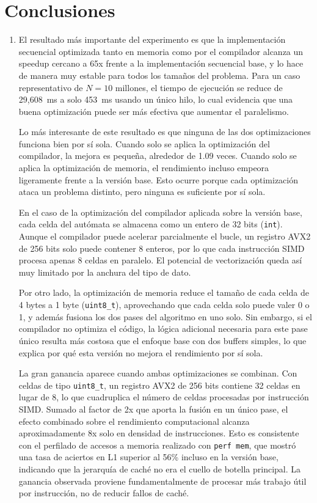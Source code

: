 
\section{Conclusiones}
\label{sec:Conclusiones}

\begin{enumerate}
   \item
El resultado más importante del experimento es que la implementación secuencial optimizada
tanto en memoria como por el compilador alcanza un speedup cercano a 65x frente a la
implementación secuencial base, y lo hace de manera muy estable para todos los tamaños del
problema. Para un caso representativo de $N=10$ millones, el tiempo de ejecución se reduce
de 29{,}608~ms a solo 453~ms usando un único hilo, lo cual evidencia que una buena
optimización puede ser más efectiva que aumentar el paralelismo.

Lo más interesante de este resultado es que ninguna de las dos optimizaciones funciona bien
por sí sola. Cuando solo se aplica la optimización del compilador, la mejora es pequeña,
alrededor de 1.09 veces. Cuando solo se aplica la optimización de memoria, el rendimiento
incluso empeora ligeramente frente a la versión base. Esto ocurre porque cada optimización
ataca un problema distinto, pero ninguna es suficiente por sí sola.

En el caso de la optimización del compilador aplicada sobre la versión base, cada celda del
autómata se almacena como un entero de 32 bits (\texttt{int}). Aunque el compilador puede
acelerar parcialmente el bucle, un registro AVX2 de 256 bits solo puede contener 8 enteros,
por lo que cada instrucción SIMD procesa apenas 8 celdas en paralelo. El potencial de
vectorización queda así muy limitado por la anchura del tipo de dato.

Por otro lado, la optimización de memoria reduce el tamaño de cada celda de 4 bytes a 1
byte (\texttt{uint8\_t}), aprovechando que cada celda solo puede valer 0 o 1, y además
fusiona los dos pases del algoritmo en uno solo. Sin embargo, si el compilador no optimiza
el código, la lógica adicional necesaria para este pase único resulta más costosa que el
enfoque base con dos buffers simples, lo que explica por qué esta versión no mejora el
rendimiento por sí sola.

La gran ganancia aparece cuando ambas optimizaciones se combinan. Con celdas de tipo
\texttt{uint8\_t}, un registro AVX2 de 256 bits contiene 32 celdas en lugar de 8, lo que
cuadruplica el número de celdas procesadas por instrucción SIMD. Sumado al factor de 2x
que aporta la fusión en un único pase, el efecto combinado sobre el rendimiento
computacional alcanza aproximadamente 8x solo en densidad de instrucciones. Esto es
consistente con el perfilado de accesos a memoria realizado con \texttt{perf mem}, que
mostró una tasa de aciertos en L1 superior al 56\% incluso en la versión base, indicando
que la jerarquía de caché no era el cuello de botella principal. La ganancia observada
proviene fundamentalmente de procesar más trabajo útil por instrucción, no de reducir
fallos de caché.


\end{enumerate}

